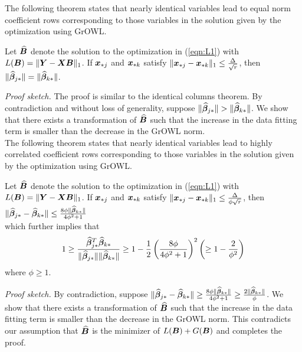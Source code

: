 The following theorem states that nearly identical variables lead to equal norm coefficient rows corresponding to those variables in the solution given by the optimization using GrOWL.
\begin{theorem}\label{thm2}
Let $\widehat {\boldsymbol{B}}$ denote the solution to the optimization in (\ref{eqn:L1}) with $L(\boldsymbol{B}) = \|\boldsymbol{Y} - \boldsymbol{X} \boldsymbol{B} \|_1$.
If $\boldsymbol{x}_{{\ast} j}$ and $\boldsymbol{x}_{{\ast} k}$ satisfy $\|\boldsymbol{x}_{{\ast} j} - \boldsymbol{x}_{{\ast} k}\|_1 \leq \frac{\Delta}{\sqrt{r}} $, then
$\|\widehat {\boldsymbol{\beta}}_{j {\ast}}\| = \|\widehat {\boldsymbol{\beta}}_{k {\ast}}\|$.

\end{theorem}
\textit{Proof sketch.}
The proof is similar to the identical columns theorem. By contradiction and without loss of generality, suppose $\|\widehat {\boldsymbol{\beta}}_{j {\ast}}\| > \|\widehat {\boldsymbol{\beta}}_{k {\ast}}\|$. We show that there exists a transformation of $\widehat{\boldsymbol{B}}$ such that the increase in the data fitting term is smaller than the decrease in the GrOWL norm. \\


The following theorem states that nearly identical variables lead to highly correlated coefficient rows corresponding to those variables in the solution given by the optimization using GrOWL.
\begin{theorem}\label{thm3}
Let $\widehat {\boldsymbol{B}}$ denote the solution to the optimization in (\ref{eqn:L1}) with $L(\boldsymbol{B}) = \|\boldsymbol{Y} - \boldsymbol{X} \boldsymbol{B} \|_1$.
If $\boldsymbol{x}_{{\ast} j}$ and $\boldsymbol{x}_{{\ast} k}$ satisfy $\|\boldsymbol{x}_{{\ast} j} - \boldsymbol{x}_{{\ast} k}\|_1 \leq \frac{\Delta}{\phi\sqrt{r}} $, then
$\|\widehat {\boldsymbol{\beta}}_{j {\ast}} - \widehat {\boldsymbol{\beta}}_{k {\ast}}\| \leq \frac{8\phi \|\widehat {\boldsymbol{\beta}}_{k {\ast}}\|}{4\phi^2+1}$ 
\\which further implies that 
$$1 \geq \frac{\widehat {\boldsymbol{\beta}}_{j {\ast}}^T \widehat {\boldsymbol{\beta}}_{k {\ast}}}{\|\widehat {\boldsymbol{\beta}}_{j {\ast}}\|\| \widehat {\boldsymbol{\beta}}_{k {\ast}}\|} \geq 1 - \frac{1}{2}\left( \frac{8\phi}{4\phi^2+1}\right)^2     \left( \geq 1 - \frac{2}{\phi^2}\right)$$ where $\phi \geq 1$.

\end{theorem}
\textit{Proof sketch.}
By contradiction, suppose $\|\widehat {\boldsymbol{\beta}}_{j {\ast}} - \widehat {\boldsymbol{\beta}}_{k {\ast}}\| \geq \frac{8\phi \|\widehat {\boldsymbol{\beta}}_{k {\ast}}\|}{4\phi^2+1}  \geq \frac{2 \|\widehat {\boldsymbol{\beta}}_{k {\ast}}\|}{\phi}$. We show that there exists a transformation of $\widehat{\boldsymbol{B}}$ such that the increase in the data fitting term is smaller than the decrease in the GrOWL norm. This contradicts our assumption that $\widehat{\boldsymbol{B}}$ is the minimizer of $L(\boldsymbol{B}) + G(\boldsymbol{B})$ and completes the proof.\\

